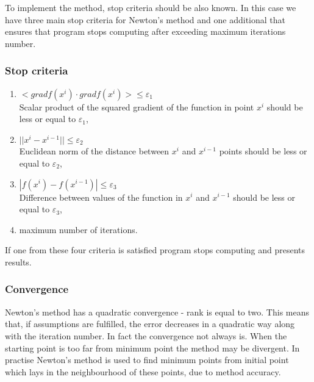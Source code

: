 \documentclass[12pt]{article}
\begin{document}
 To implement the method, stop criteria should be also known. In this case we have three main stop criteria for Newton's method and one additional that ensures that program stops computing after exceeding maximum iterations number.

\subsubsection{Stop criteria}
\begin{enumerate}
\item $ <grad f(x^i) \cdot grad f(x^i)> \leqslant \varepsilon_1 $ \\
Scalar product of the squared gradient of the function in point $x^i$ should be less or equal to $\varepsilon_1 $,
\item $ ||x^i-x^{i-1}|| \leqslant \varepsilon_2 $ \\
Euclidean norm of the distance between $x^i$ and $x^{i-1}$ points should be less or equal to $\varepsilon_2 $,
\item $ |f(x^i)-f(x^{i-1})| \leqslant \varepsilon_3 $ \\
Difference between values of the function in $x^i$ and $x^{i-1}$ should be less or equal to $\varepsilon_3 $,
\item maximum number of iterations.
\end{enumerate}  
If one from these four criteria is satisfied program stops computing and presents results. 

\subsubsection{Convergence}
Newton's method has a quadratic convergence - rank is equal to two. This means that, if assumptions are fulfilled, the error decreases in a quadratic way along with the iteration number. In fact the convergence not always is. When the starting point is too far from minimum point the method may be divergent. In practise Newton's method is used to find minimum points from initial point which lays in the neighbourhood of these points, due to method accuracy. 
\end{document}
